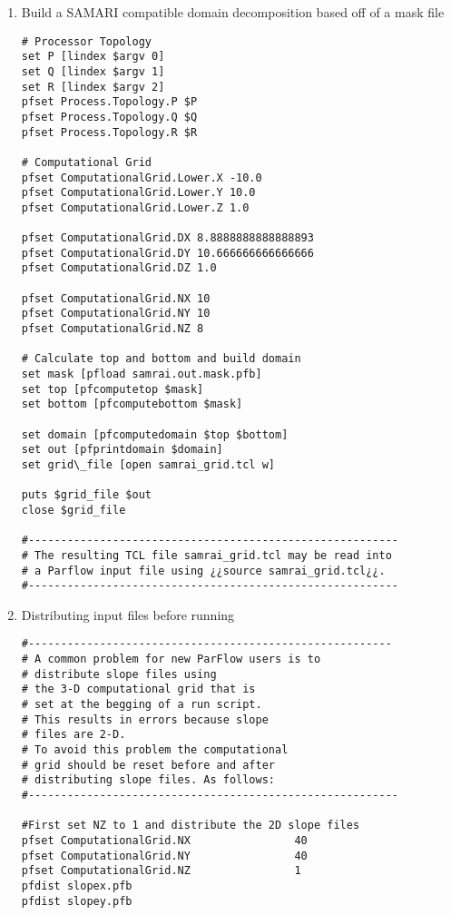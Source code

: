 \begin{enumerate}
\item Build a SAMARI compatible domain decomposition based off of a mask file
\begin{display}\begin{verbatim}
# Processor Topology
set P [lindex $argv 0]
set Q [lindex $argv 1]
set R [lindex $argv 2]
pfset Process.Topology.P $P
pfset Process.Topology.Q $Q
pfset Process.Topology.R $R

# Computational Grid
pfset ComputationalGrid.Lower.X -10.0
pfset ComputationalGrid.Lower.Y 10.0
pfset ComputationalGrid.Lower.Z 1.0

pfset ComputationalGrid.DX 8.8888888888888893
pfset ComputationalGrid.DY 10.666666666666666
pfset ComputationalGrid.DZ 1.0

pfset ComputationalGrid.NX 10
pfset ComputationalGrid.NY 10
pfset ComputationalGrid.NZ 8

# Calculate top and bottom and build domain
set mask [pfload samrai.out.mask.pfb]
set top [pfcomputetop $mask]
set bottom [pfcomputebottom $mask]

set domain [pfcomputedomain $top $bottom]
set out [pfprintdomain $domain]
set grid\_file [open samrai_grid.tcl w]

puts $grid_file $out
close $grid_file

#---------------------------------------------------------
# The resulting TCL file samrai_grid.tcl may be read into
# a Parflow input file using ¿¿source samrai_grid.tcl¿¿.
#---------------------------------------------------------

\end{verbatim}\end{display}
\item Distributing input files before running
\begin{display}\begin{verbatim}
#--------------------------------------------------------
# A common problem for new ParFlow users is to 
# distribute slope files using 
# the 3-D computational grid that is
# set at the begging of a run script. 
# This results in errors because slope 
# files are 2-D. 
# To avoid this problem the computational 
# grid should be reset before and after
# distributing slope files. As follows:
#---------------------------------------------------------

#First set NZ to 1 and distribute the 2D slope files
pfset ComputationalGrid.NX                40 
pfset ComputationalGrid.NY                40 
pfset ComputationalGrid.NZ                1
pfdist slopex.pfb
pfdist slopey.pfb


\end{verbatim}
\end{display}
\end{enumerate}
